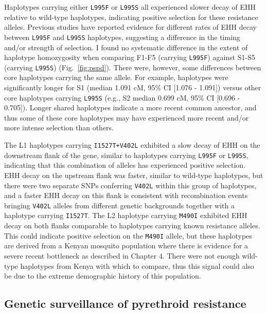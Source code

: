\documentclass[a4paper,11pt,abstracton,hidelinks]{scrartcl}
\begin{document}
Haplotypes carrying either \texttt{L995F} or \texttt{L995S} all experienced slower decay of EHH relative to wild-type haplotypes, indicating positive selection for these resistance alleles.
%
Previous studies have reported evidence for different rates of EHH decay between \texttt{L995F} and \texttt{L995S} haplotypes, suggesting a difference in the timing and/or strength of selection.
%
I found no systematic difference in the extent of haplotype homozygosity when comparing F1-F5 (carrying \texttt{L995F}) against S1-S5 (carrying \texttt{L995S}) (Fig.~\ref{fig:pspd}).
%
There were, however, some differences between core haplotypes carrying the same allele.
%
For example, haplotypes were significantly longer for S1 (median 1.091 cM, 95\% CI [1.076 - 1.091]) versus other core haplotypes carrying \texttt{L995S} (e.g., S2 median 0.699 cM, 95\% CI [0.696 - 0.705]).
%
Longer shared haplotypes indicate a more recent common ancestor, and thus some of these core haplotypes may have experienced more recent and/or more intense selection than others.


The L1 haplotypes carrying \texttt{I1527T+V402L} exhibited a slow decay of EHH on the downstream flank of the gene, similar to haplotypes carrying \texttt{L995F} or \texttt{L995S}, indicating that this combination of alleles has experienced positive selection.
%
EHH decay on the upstream flank was faster, similar to wild-type haplotypes, but there were two separate SNPs conferring \texttt{V402L} within this group of haplotypes, and a faster EHH decay on this flank is consistent with recombination events bringing \texttt{V402L} alleles from different genetic backgrounds together with a haplotype carrying \texttt{I1527T}.
%
The L2 haplotype carrying \texttt{M490I} exhibited EHH decay on both flanks comparable to haplotypes carrying known resistance alleles.
%
This could indicate positive selection on the \texttt{M490I} allele, but these haplotypes are derived from a Kenyan mosquito population where there is evidence for a severe recent bottleneck as described in Chapter 4.
%
There were not enough wild-type haplotypes from Kenya with which to compare, thus this signal could also be due to the extreme demographic history of this population.


\subsection{Genetic surveillance of pyrethroid resistance}\label{subsec:results-tracking}
\end{document}
